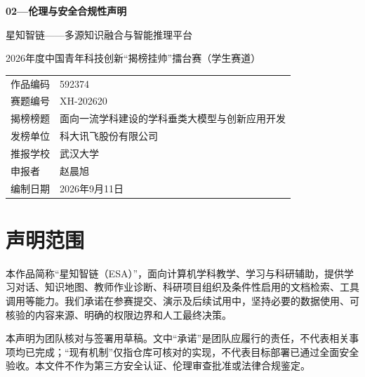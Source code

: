 \documentclass[UTF8,a4paper,zihao=-4,fontset=fandol]{ctexart}
\begin{document}
\begin{center}
  {\LARGE\bfseries 02—伦理与安全合规性声明}\par\vspace{0.7em}
  {\large 星知智链——多源知识融合与智能推理平台}\par
  2026年度中国青年科技创新“揭榜挂帅”擂台赛（学生赛道）
\end{center}
\noindent\begin{tabularx}{\textwidth}{@{}lX@{}}
\toprule
作品编码 & 592374 \\
赛题编号 & XH-202620 \\
揭榜榜题 & 面向一流学科建设的学科垂类大模型与创新应用开发 \\
发榜单位 & 科大讯飞股份有限公司 \\
推报学校 & 武汉大学 \\
申报者 & 赵晨旭 \\
编制日期 & 2026年9月11日 \\
\bottomrule
\end{tabularx}

\section{声明范围}
本作品简称“星知智链（ESA）”，面向计算机学科教学、学习与科研辅助，提供学习对话、知识地图、教师作业诊断、科研项目组织及条件性启用的文档检索、工具调用等能力。我们承诺在参赛提交、演示及后续试用中，坚持必要的数据使用、可核验的内容来源、明确的权限边界和人工最终决策。

本声明为团队核对与签署用草稿。文中“承诺”是团队应履行的责任，不代表相关事项均已完成；“现有机制”仅指仓库可核对的实现，不代表目标部署已通过全面安全验收。本文件不作为第三方安全认证、伦理审查批准或法律合规鉴定。
\end{document}
